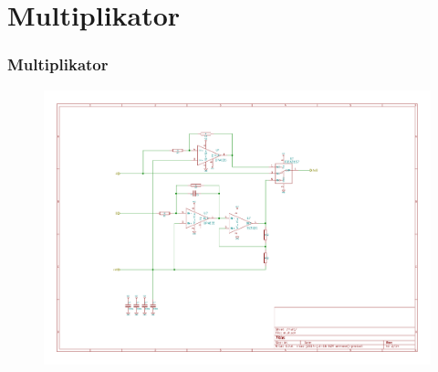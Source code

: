 \section{Multiplikator}
\begin{frame}
    \frametitle{Multiplikator}
    \begin{figure}
            \includegraphics[width=\textwidth]{fig/mult-mult.pdf}
    \end{figure}
\end{frame}
